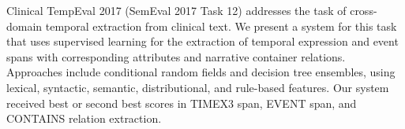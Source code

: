 Clinical TempEval 2017 (SemEval 2017 Task 12) addresses the task of cross-domain temporal extraction from clinical text. We present a system for this task that uses supervised learning for the extraction of temporal expression and event spans with corresponding attributes and narrative container relations. Approaches include conditional random fields and decision tree ensembles, using lexical, syntactic, semantic, distributional, and rule-based features. Our system received best or second best scores in TIMEX3 span, EVENT span, and CONTAINS relation extraction.
